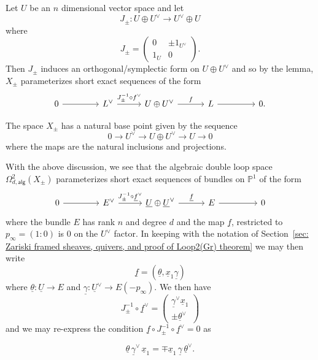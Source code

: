 \documentclass{amsart}
\theoremstyle{definition}
\newcommand{\PP}{\mathbb{P}}
\newcommand{\UL}[1]{\underline{#1}}
\newcommand{\alg}{\mathsf{alg}}
\newcommand{\LoopTwo}{\Omega^{2}_{d,\alg}}
\newcommand{\Xpm}{X_{\pm}}
\begin{document}
Let $U$ be an $n$ dimensional vector space and let 
\[
J_{\pm}: U\oplus U^{\vee} \to U^{\vee}\oplus U
\]
where 
\[
J_{\pm} = \begin{pmatrix}
        0 & \pm 1_{U^{\vee }}\\
        1_{U} & 0
      \end{pmatrix}.
\]
Then $J_{\pm}$ induces an orthogonal/symplectic form on $U\oplus
U^{\vee}$ and so by the lemma, $\Xpm$ parameterizes short exact
sequences of the form
\[
\begin{tikzcd}[column sep={6em,between origins}]
0 \arrow[r] &
L^{\vee } \arrow[r, "J_{\pm }^{-1}\circ f^{\vee}"] &
U\oplus U^{\vee } \arrow[r, "f"] &
L \arrow[r] &
0.
\end{tikzcd}
\]

The space $\Xpm$ has a natural base point given by the sequence
\[
0\to U^{\vee}\to U\oplus U^{\vee} \to U\to 0
\]
where the maps are the natural inclusions and projections.

With the above discussion, we see that the algebraic double loop space
$\LoopTwo(\Xpm )$ parameterizes short exact sequences of
bundles on $\PP^{1}$ of the form
\begin{equation}\label{eqn: Evee-->U+Uvee-->E}
\begin{tikzcd}[column sep={6em,between origins}]
0 \arrow[r] &
E^{\vee } \arrow[r, "J_{\pm }^{-1}\circ \UL{f}^{\vee}"] &
\UL{U}\oplus \UL{U}^{\vee } \arrow[r, "\UL{f}"] &
E \arrow[r] &
0
\end{tikzcd}
\end{equation}
where the bundle $E$ has rank $n$ and degree $d$ and the map $\UL{f}$,
restricted to $p_{\infty} = (1:0)$ is 0 on the $U^{\vee}$ factor. In
keeping with the notation of Section~\ref{sec: Zariski framed sheaves,
quivers, and proof of Loop2(Gr) theorem} we may then write
\[
\UL{f} = (\UL{\theta},\UL{x}_{1}\UL{\gamma})
\]
where $\UL{\theta}:\UL{U}\to E$ and $\UL{\gamma}:\UL{U}^{\vee}\to
E(-p_{\infty}).$ We then have
\[
J_{\pm}^{-1}\circ \UL{f}^{\vee} = \begin{pmatrix} \UL{\gamma}^{\vee}\UL{x}_{1} \\
\pm \UL{\theta}^{\vee}  \end{pmatrix}
\]
and we may re-express the condition $\UL{f}\circ J_{\pm}^{-1}\circ
\UL{f}^{\vee}=0$ as

\begin{equation}\label{eqn: theta gammadual x1 = mp x1 gamma thetadual}
\UL{\theta}\, \UL{\gamma}^{\vee}\, \UL{x}_{1} =  \mp \UL{x}_{1}\, 
\UL{\gamma}\,  \UL{\theta}^{\vee }.
\end{equation}
\end{document}
